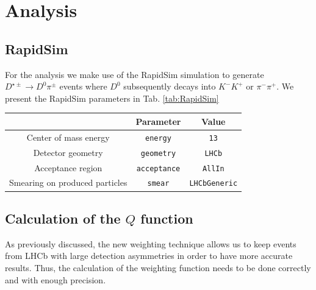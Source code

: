 \documentclass{article}
\begin{document}
        
        \section{Analysis}
        \subsection{RapidSim}
        For the analysis we make use of the RapidSim simulation \cite{Cowan:2016tnm} to generate $D^{\star \pm}\to D^0 \pi^\pm$ events where $D^0$ subsequently decays into $K^-K^+$ or $\pi^-\pi^+$.
        We present the RapidSim parameters in Tab. \ref{tab:RapidSim}

        \begin{center}
                \begin{tabular}{c|c|c}
                        & Parameter & Value\\
                        \hline\hline
                        Center of mass energy & \texttt{energy} &               \texttt{13}\\
                        Detector geometry & \texttt{geometry} &                 \texttt{LHCb}\\
                        Acceptance region & \texttt{acceptance} &               \texttt{AllIn}\\
                        Smearing on produced particles & \texttt{smear} &       \texttt{LHCbGeneric}
                \end{tabular}
                \label{tab:RapidSim}
        \end{center}

        \subsection{Calculation of the $Q$ function}
        As previously discussed, the new weighting technique allows us to keep events from LHCb with large detection asymmetries in order to have more accurate results.
        Thus, the calculation of the weighting function needs to be done correctly and with enough precision.
\end{document}
